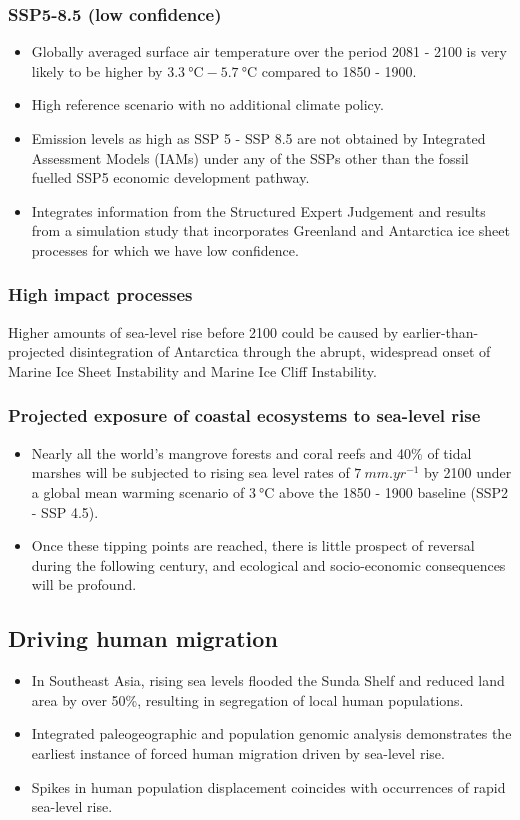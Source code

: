 \documentclass[11pt]{article}
\begin{document}
\subsubsection{SSP5-8.5 (low confidence)}
\label{sec:orgf132717}
\begin{itemize}
\item Globally averaged surface air temperature over the period 2081 - 2100 is very likely to be higher by \(\qty{3.3}{\degreeCelsius} - \qty{5.7}{\degreeCelsius}\) compared to 1850 - 1900.
\item High reference scenario with no additional climate policy.
\item Emission levels as high as SSP 5 - SSP 8.5 are not obtained by Integrated Assessment Models (IAMs) under any of the SSPs other than the fossil fuelled SSP5 economic development pathway.
\item Integrates information from the Structured Expert Judgement and results from a simulation study that incorporates Greenland and Antarctica ice sheet processes for which we have low confidence.
\end{itemize}
\subsubsection{High impact processes}
\label{sec:orgf126154}
Higher amounts of sea-level rise before 2100 could be caused by earlier-than-projected disintegration of Antarctica through the abrupt, widespread onset of Marine Ice Sheet Instability and Marine Ice Cliff Instability.
\subsubsection{Projected exposure of coastal ecosystems to sea-level rise}
\label{sec:orgd8e66dc}
\begin{itemize}
\item Nearly all the world's mangrove forests and coral reefs and 40\% of tidal marshes will be subjected to rising sea level rates of \(\qty{7}{mm.yr^{-1}}\) by 2100 under a global mean warming scenario of \(\qty{3}{\degreeCelsius}\) above the 1850 - 1900 baseline (SSP2 - SSP 4.5).
\item Once these tipping points are reached, there is little prospect of reversal during the following century, and ecological and socio-economic consequences will be profound.
\end{itemize}
\subsection{Driving human migration}
\label{sec:org0ccdf69}
\begin{itemize}
\item In Southeast Asia, rising sea levels flooded the Sunda Shelf and reduced land area by over 50\%, resulting in segregation of local human populations.
\item Integrated paleogeographic and population genomic analysis demonstrates the earliest instance of forced human migration driven by sea-level rise.
\item Spikes in human population displacement coincides with occurrences of rapid sea-level rise.
\end{itemize}
\end{document}
